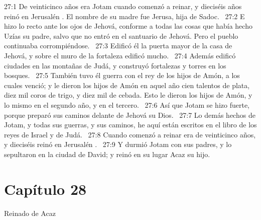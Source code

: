 																											
																											27:1 De veinticinco años era Jotam cuando comenzó a reinar, y dieciséis años reinó en Jerusalén . El nombre de su madre fue Jerusa, hija de Sadoc.  
																											27:2 E hizo lo recto ante los ojos de Jehová, conforme a todas las cosas que había hecho Uzías su padre, salvo que no entró en el santuario de Jehová. Pero el pueblo continuaba corrompiéndose.  
																											27:3 Edificó él la puerta mayor de la casa de Jehová, y sobre el muro de la fortaleza edificó mucho.  
																											27:4 Además edificó ciudades en las montañas de Judá, y construyó fortalezas y torres en los bosques.  
																											27:5 También tuvo él guerra con el rey de los hijos de Amón, a los cuales venció; y le dieron los hijos de Amón en aquel año cien talentos de plata, diez mil coros de trigo, y diez mil de cebada. Esto le dieron los hijos de Amón, y lo mismo en el segundo año, y en el tercero.  
																											27:6 Así que Jotam se hizo fuerte, porque preparó sus caminos delante de Jehová su Dios.  
																											27:7 Lo demás hechos de Jotam, y todas sus guerras, y sus caminos, he aquí están escritos en el libro de los reyes de Israel y de Judá.  
																											27:8 Cuando comenzó a reinar era de veinticinco años, y dieciséis reinó en Jerusalén .  
																											27:9 Y durmió Jotam con sus padres, y lo sepultaron en la ciudad de David; y reinó en su lugar Acaz su hijo.  
																											\section*{Capítulo 28}
																												Reinado de Acaz  
																												
